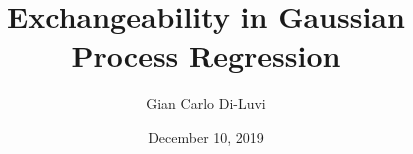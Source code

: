 \documentclass[10pt]{article}
\title{Exchangeability in Gaussian Process Regression} %
\author{Gian Carlo Di-Luvi} %
\date{December 10, 2019} %
\begin{document}
\maketitle














\clearpage
\appendix






\nocite{*}
\printbibliography
\end{document}
